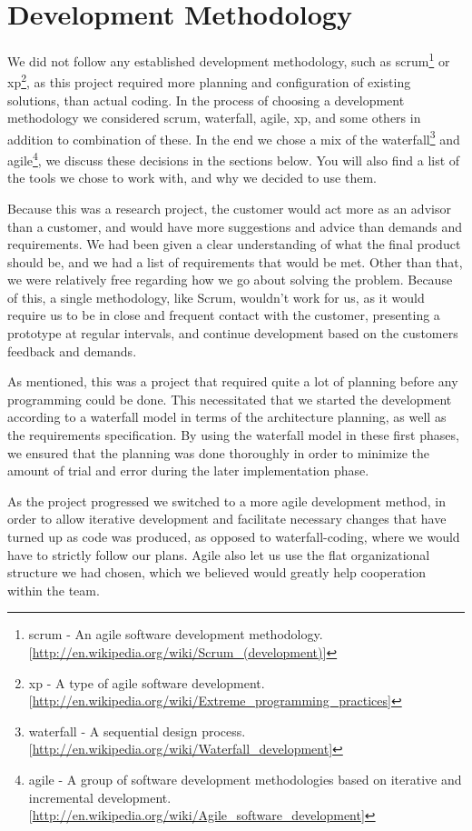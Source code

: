 \section{Development Methodology}\label{Development Methodology} 
    We did not follow any established development methodology, such as \gls{scrum}\footnote{\gls{scrum} - An agile software development methodology. [\url{http://en.wikipedia.org/wiki/Scrum_(development)}]} or \gls{xp}\footnote{\gls{xp} - A type of agile software development. [\url{http://en.wikipedia.org/wiki/Extreme_programming_practices}]}, as this project required more planning and configuration of existing solutions, than actual coding. In the process of choosing a development methodology we considered scrum, waterfall, agile, xp, and some others in addition to combination of these. In the end we chose a mix of the \gls{waterfall}\footnote{\gls{waterfall} - A sequential design process. [\url{http://en.wikipedia.org/wiki/Waterfall_development}]} and \gls{agile}\footnote{\gls{agile} - A group of software development methodologies based on iterative and incremental development. [\url{http://en.wikipedia.org/wiki/Agile_software_development}]}, we discuss these decisions in the sections below. You will also find a list of the tools we chose to work with, and why we decided to use them. 
    
    Because this was a research project, the customer would act more as an advisor than a customer, and would have more suggestions and advice than demands and requirements. We had been given a clear understanding of what the final product should be, and we had a list of requirements that would be met. Other than that, we were relatively free regarding how we go about solving the problem. Because of this, a single methodology, like Scrum, wouldn't work for us, as it would require us to be in close and frequent contact with the customer, presenting a prototype at regular intervals, and continue development based on the customers feedback and demands.
    
    As mentioned, this was a project that required quite a lot of planning before any programming could be done. This necessitated that we started the development according to a waterfall model in terms of the architecture planning, as well as the requirements specification. By using the waterfall model in these first phases, we ensured that the planning was done thoroughly in order to minimize the amount of trial and error during the later implementation phase.
    
    As the project progressed we switched to a more agile development method, in order to allow iterative development and facilitate necessary changes that have turned up as code was produced, as opposed to waterfall-coding, where we would have to strictly follow our plans. Agile also let us use the flat organizational structure we had chosen, which we believed would greatly help cooperation within the team.
    
